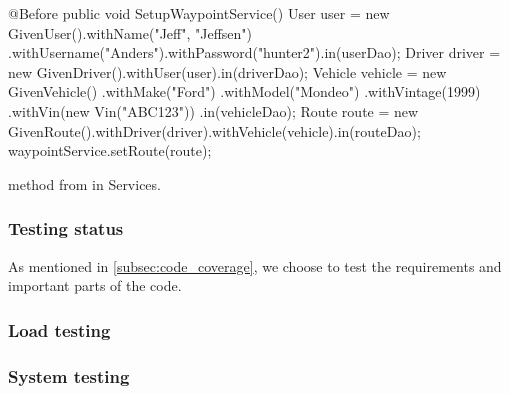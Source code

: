 \begin{listing}
    \begin{java2}
        @Before
        public void SetupWaypointService() {
            User user = new GivenUser().withName("Jeff", "Jeffsen")
                .withUsername("Anders").withPassword("hunter2").in(userDao);
            Driver driver = new GivenDriver().withUser(user).in(driverDao);
            Vehicle vehicle = new GivenVehicle()
                .withMake("Ford")
                .withModel("Mondeo")
                .withVintage(1999)
                .withVin(new Vin("ABC123"))
                .in(vehicleDao);
            Route route = new GivenRoute().withDriver(driver).withVehicle(vehicle).in(routeDao);
            waypointService.setRoute(route);
        }        
    \end{java2}
    \caption{ method from  in Services.}
    \label{lst:setupwaypointservice}
\end{listing}

\subsubsection{Testing status}
As mentioned in \cref{subsec:code_coverage}, we choose to test the requirements and important parts of the code.


\subsubsection{Load testing}


\subsubsection{System testing}


